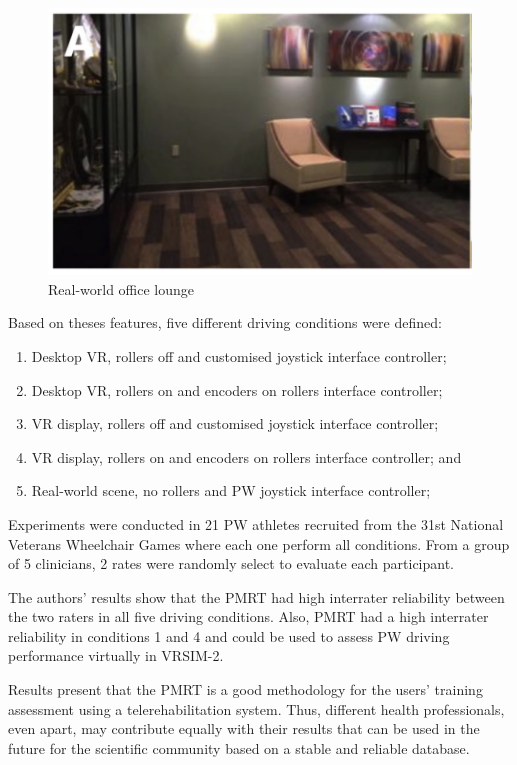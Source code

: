 \begin{figure}[!htbp]
\begin{minipage}{0.495\linewidth}
\center
\captionsetup{justification=centering,margin=0.5cm,font=small}
\includegraphics[width=1\linewidth]{img/cap3/kamaraj2016-VRA}
\caption{Real-world office lounge \cite{kamaraj2016}} \label{fig:kamaraj2016-VRA}
\end{minipage}
\end{figure}

Based on theses features, five different driving conditions were defined:
\begin{enumerate}
\item Desktop VR, rollers off and customised joystick interface controller;
\item Desktop VR, rollers on  and encoders on rollers interface controller;
\item VR display, rollers off and customised joystick interface controller;
\item VR display, rollers on  and encoders on rollers interface controller; and
\item Real-world scene, no rollers and PW joystick interface controller;
\end{enumerate}

Experiments were conducted in 21 PW athletes recruited from the 31st National Veterans Wheelchair Games where each one perform all conditions. From a group of 5 clinicians, 2 rates were randomly select to evaluate each participant.

The authors' results show that the PMRT had high interrater reliability between the two raters in all five driving conditions. Also, PMRT had a high interrater reliability in conditions 1 and 4 and could be used to assess PW driving performance virtually in VRSIM-2. 

Results present that the PMRT is a good methodology for the users' training assessment using a telerehabilitation system. Thus, different health professionals, even apart, may contribute equally with their results that can be used in the future for the scientific community based on a stable and reliable database.


